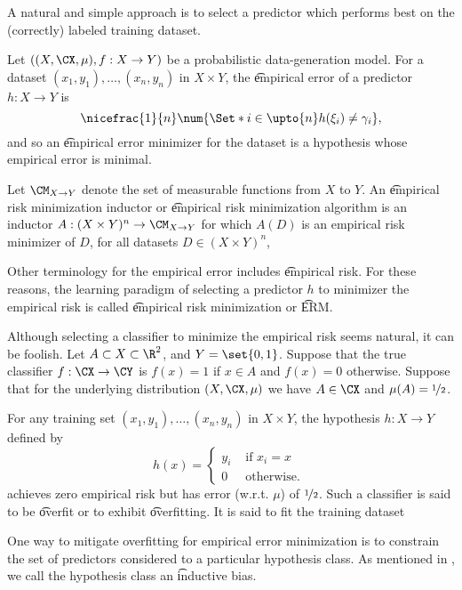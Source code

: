 

A natural and simple approach is to select a predictor which performs best on the (correctly) labeled training dataset.


Let $((X, \CX, \mu), f: X \to Y)$ be a probabilistic data-generation model.
For a dataset $(x_1, y_1), \dots, (x_n, y_n)$ in $X \times Y$, the \t{empirical error} of a predictor $h: X \to Y$ is
\[
  \nicefrac{1}{n}\num{\Set*{i \in \upto{n}}{h(\xi_i) \neq \gamma_i}},
\]
and so an \t{empirical error minimizer} for the dataset is a hypothesis whose empirical error is minimal.

Let $\CM_{X \to Y}$ denote the set of measurable functions from $X$ to $Y$.
An \t{empirical risk minimization inductor} or \t{empirical risk minimization algorithm} is an inductor $A: (X \times Y)^n \to \CM_{X \to Y}$ for which $A(D)$ is an empirical risk minimizer of $D$, for all datasets $D \in (X \times Y)^n$,

Other terminology for the empirical error includes \t{empirical risk}.
For these reasons, the learning paradigm of selecting a predictor $h$ to minimizer the empirical risk is called \t{empirical risk minimization} or \t{ERM}.


Although selecting a classifier to minimize the empirical risk seems natural, it can be foolish.
Let $A \subset X \subset \R^2$, and $Y = \set{0, 1}$.
Suppose that the true classifier $f: \CX \to \CY$ is $f(x) = 1$ if $x \in A$ and $f(x) = 0$ otherwise.
Suppose that for the underlying distribution $(X, \CX, \mu)$ we have $A \in \CX$ and $\mu(A) = \nicefrac{1}{2}$.

For any training set $(x_1, y_1), \dots, (x_n, y_n)$ in $X \times Y$, the hypothesis $h: X \to Y$ defined by
\[
	h(x) = \begin{cases}
 	y_i & \text{ if } x_i = x \\
 	0 & \text{ otherwise. }
 \end{cases}
\]
achieves zero empirical risk but has error (w.r.t. $\mu$) of $\nicefrac{1}{2}$.
Such a classifier is said to be \t{overfit} or to exhibit \t{overfitting}.
It is said to fit the training dataset 


One way to mitigate overfitting for empirical error minimization is to constrain the set of predictors considered to a particular hypothesis class.
As mentioned in , we call the hypothesis class an \t{inductive bias}.


